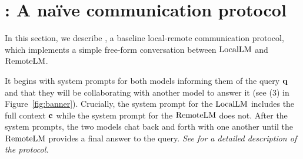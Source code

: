 \vspace{-0.75em}
\section{\naive: A naïve communication protocol}
\label{sec:naive}


In this section, we describe \naive, a baseline local-remote communication protocol, which implements a simple free-form conversation between $\mathrm{LocalLM}$ and $\mathrm{RemoteLM}$.

It begins with system prompts for both models informing them of the query $\mathbf{q}$ and that they will be collaborating with another model to answer it (see (3) in Figure~\ref{fig:banner}). 
Crucially, the system prompt for the $\mathrm{LocalLM}$ includes the full context $\mathbf{c}$ while the system prompt for the $\mathrm{RemoteLM}$ does not.
After the system prompts, the two models chat back and forth with one another until the $\mathrm{RemoteLM}$ provides a final answer to the query. 
% 
% 
\textit{See  for a detailed description of the \naive protocol.}



